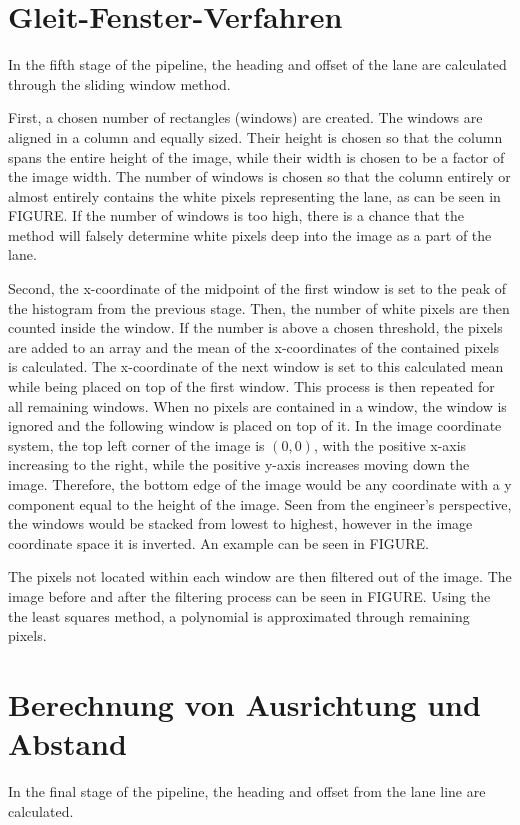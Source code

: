 \documentclass[arbeit=studie,oneside,BCOR=12mm]{ArbeitRST}
\begin{document}
\section{Gleit-Fenster-Verfahren}

In the fifth stage of the pipeline, the heading and offset of the lane are
calculated through the sliding window method.

First, a chosen number of rectangles (windows) are created. The windows are
aligned in a column and equally sized. Their height is chosen so that the
column spans the entire height of the image, while their width is chosen to be
a factor of the image width. The number of windows is chosen so that the column
entirely or almost entirely  contains the white pixels representing the lane,
as can be seen in FIGURE. If the number of windows is too high, there is a
chance that the method will falsely determine white pixels deep into the image
as a part of the lane. 

Second, the x-coordinate of the midpoint of the first window is set to the peak
of the histogram from the previous stage. Then, the number of white pixels are
then counted inside the window. If the number is above a chosen threshold, the
pixels are added to an array and the mean of the x-coordinates of the contained
pixels is calculated. The x-coordinate of the next window is set to this
calculated mean while being placed on top of the first window. This process is
then repeated for all remaining windows. When no pixels are contained in a
window, the window is ignored and the following window is placed on top of it.
In the image coordinate system, the top left corner of the image is $(0, 0)$,
with the positive x-axis increasing to the right, while the positive y-axis
increases moving down the image. Therefore, the bottom edge of the image would
be any coordinate with a y component equal to the height of the image. Seen
from the engineer's perspective, the windows would be stacked from lowest to
highest, however in the image coordinate space it is inverted. An example can
be seen in FIGURE.

The pixels not located within each window are then filtered out of the image.
The image before and after the filtering process can be seen in FIGURE. Using
the the least squares method, a polynomial is approximated through remaining
pixels.

\section{Berechnung von Ausrichtung und Abstand}
In the final stage of the pipeline, the heading and offset from the lane line
are calculated. 
\end{document}
